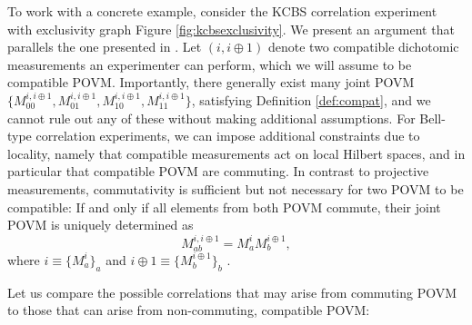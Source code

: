 To work with a concrete example, consider the KCBS correlation experiment with exclusivity graph Figure \ref{fig:kcbsexclusivity}. We present an argument that parallels the one presented in \cite{Kunjwal2019}.
Let $(i,i\oplus1)$ denote two compatible dichotomic measurements an experimenter can perform, which we will assume to be compatible POVM. Importantly, there generally exist many joint POVM $\{M_{00}^{i,i\oplus1},M_{01}^{i,i\oplus1}, M_{10}^{i,i\oplus1},M_{11}^{i,i\oplus1}\}$, satisfying Definition \ref{def:compat}, and we cannot rule out any of these without making additional assumptions. For Bell-type correlation experiments, we can impose additional constraints due to locality, namely that compatible measurements act on local Hilbert spaces, and in particular that compatible POVM are commuting. In contrast to projective measurements, commutativity is sufficient but not necessary for two POVM to be compatible: If and only if all elements from both POVM commute, their joint POVM is uniquely determined as
\begin{equation*}
    M_{ab}^{i,i\oplus 1}=M_{a}^i M_{b}^{i\oplus1},
\end{equation*}
where $i\equiv\{M_{a}^i\}_a$ and $i\oplus1\equiv\{M_{b}^{i\oplus1}\}_b$ \cite{Kunjwal2019}.

Let us compare the possible correlations that may arise from commuting POVM to those that can arise from non-commuting, compatible POVM:

